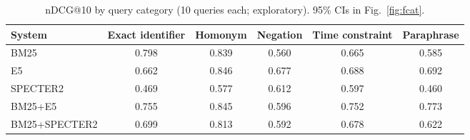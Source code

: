 \begin{table}[t]
\centering
\small
\caption{nDCG@10 by query category (10 queries each; exploratory). 95\% CIs in Fig.~\ref{fig:fcat}.}
\label{tab:fcat}
\begin{tabular}{lccccc}
\toprule
System & Exact identifier & Homonym & Negation & Time constraint & Paraphrase \\
\midrule
BM25 & 0.798 & 0.839 & 0.560 & 0.665 & 0.585 \\
E5 & 0.662 & 0.846 & 0.677 & 0.688 & 0.692 \\
SPECTER2 & 0.469 & 0.577 & 0.612 & 0.597 & 0.460 \\
BM25+E5 & 0.755 & 0.845 & 0.596 & 0.752 & 0.773 \\
BM25+SPECTER2 & 0.699 & 0.813 & 0.592 & 0.678 & 0.622 \\
\bottomrule
\end{tabular}
\end{table}
